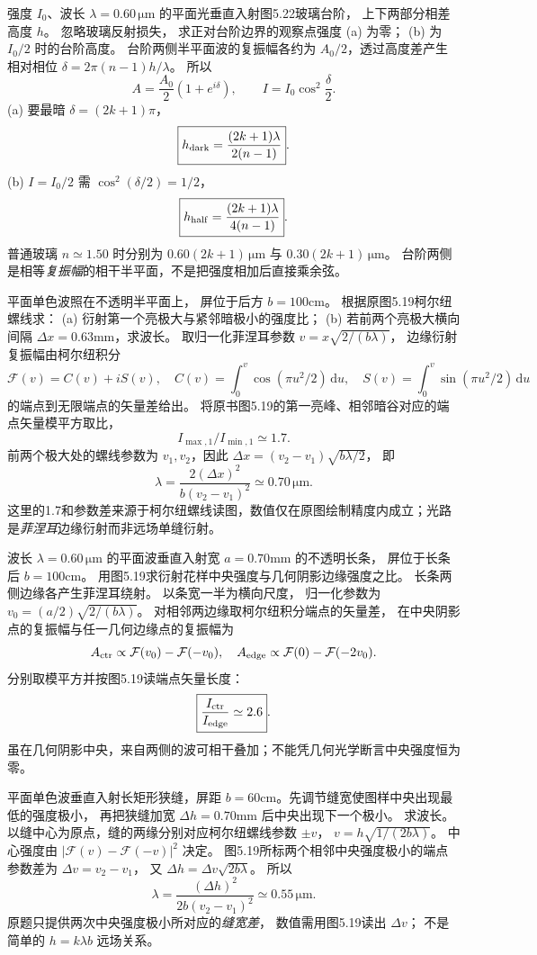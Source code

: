 强度 $I_0$、波长
$\lambda=0.60\,\mathrm{\mu m}$
的平面光垂直入射图5.22玻璃台阶，
上下两部分相差高度 $h$。
忽略玻璃反射损失，
求正对台阶边界的观察点强度
(a) 为零；
(b) 为 $I_0/2$ 时的台阶高度。
\exsolution
台阶两侧半平面波的复振幅各约为
$A_0/2$，透过高度差产生相对相位
$\delta=2\pi(n-1)h/\lambda$。
所以
\[
A=\frac{A_0}{2}(1+e^{i\delta}),
\qquad
I=I_0\cos^2\frac\delta2.
\]
(a) 要最暗 $\delta=(2k+1)\pi$，
\[
\boxed{h_{\rm dark}=
\frac{(2k+1)\lambda}{2(n-1)}}.
\]
(b) $I=I_0/2$ 需 $\cos^2(\delta/2)=1/2$，
\[
\boxed{h_{\rm half}=
\frac{(2k+1)\lambda}{4(n-1)}}.
\]
普通玻璃 $n\simeq1.50$ 时分别为
$\boxed{0.60(2k+1)\,\mathrm{\mu m}}$ 与
$\boxed{0.30(2k+1)\,\mathrm{\mu m}}$。
\excheck 台阶两侧是相等\emph{复振幅}的相干半平面，不是把强度相加后直接乘余弦。

平面单色波照在不透明半平面上，
屏位于后方
$b=100$cm。
根据原图5.19柯尔纽螺线求：
(a) 衍射第一个亮极大与紧邻暗极小的强度比；
(b) 若前两个亮极大横向间隔
$\Delta x=0.63$mm，求波长。
\exsolution
取归一化菲涅耳参数
$v=x\sqrt{2/(b\lambda)}$，
边缘衍射复振幅由柯尔纽积分
\[
\mathcal F(v)=C(v)+iS(v),\quad
C(v)=\int_0^v\cos(\pi u^2/2)\,\mathrm du,\quad
S(v)=\int_0^v\sin(\pi u^2/2)\,\mathrm du
\]
的端点到无限端点的矢量差给出。
将原书图5.19的第一亮峰、相邻暗谷对应的端点矢量模平方取比，
\[
\boxed{I_{\max,1}/I_{\min,1}\simeq1.7}.
\]
前两个极大处的螺线参数为
$v_1,v_2$，因此
$\Delta x=(v_2-v_1)\sqrt{b\lambda/2}$，
即
\[
\boxed{\lambda=
\frac{2(\Delta x)^2}{b(v_2-v_1)^2}
\simeq0.70\,\mathrm{\mu m}}.
\]
\excheck 这里的1.7和参数差来源于柯尔纽螺线读图，数值仅在原图绘制精度内成立；光路是\emph{菲涅耳}边缘衍射而非远场单缝衍射。

波长 $\lambda=0.60\,\mathrm{\mu m}$ 的平面波垂直入射宽
$a=0.70$mm 的不透明长条，
屏位于长条后
$b=100$cm。
用图5.19求衍射花样中央强度与几何阴影边缘强度之比。
\exsolution
长条两侧边缘各产生菲涅耳绕射。
以条宽一半为横向尺度，
归一化参数为
$v_0=(a/2)\sqrt{2/(b\lambda)}$。
对相邻两边缘取柯尔纽积分端点的矢量差，
在中央阴影点的复振幅与任一几何边缘点的复振幅为
\[
A_{\rm ctr}\propto\mathcal F(v_0)-\mathcal F(-v_0),
\quad
A_{\rm edge}\propto
\mathcal F(0)-\mathcal F(-2v_0).
\]
分别取模平方并按图5.19读端点矢量长度：
\[
\boxed{\frac{I_{\rm ctr}}{I_{\rm edge}}\simeq2.6}.
\]
\excheck 虽在几何阴影中央，来自两侧的波可相干叠加；不能凭几何光学断言中央强度恒为零。

平面单色波垂直入射长矩形狭缝，屏距
$b=60$cm。先调节缝宽使图样中央出现最低的强度极小，
再把狭缝加宽
$\Delta h=0.70$mm 后中央出现下一个极小。
求波长。
\exsolution
以缝中心为原点，缝的两缘分别对应柯尔纽螺线参数
$\pm v$，
$v=h\sqrt{1/(2b\lambda)}$。
中心强度由
$|\mathcal F(v)-\mathcal F(-v)|^2$ 决定。
图5.19所标两个相邻中央强度极小的端点参数差为
$\Delta v=v_2-v_1$，
又
$\Delta h=\Delta v\sqrt{2b\lambda}$。
所以
\[
\boxed{\lambda=
\frac{(\Delta h)^2}
{2b(v_2-v_1)^2}
\simeq0.55\,\mathrm{\mu m}}.
\]
\excheck 原题只提供两次中央强度极小所对应的\emph{缝宽差}，
数值需用图5.19读出 $\Delta v$；
不是简单的 $h=k\lambda b$ 远场关系。


